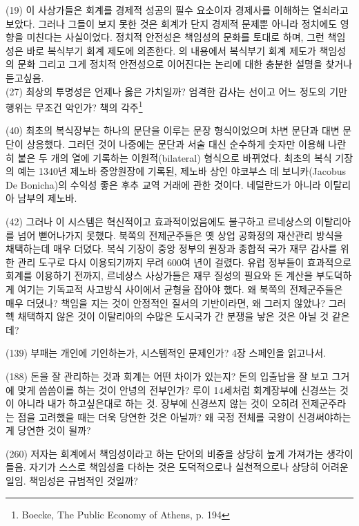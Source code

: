 \documentclass[12pt, a4paper]{article}
\begin{document}
(19) 이 사상가들은 회계를 경제적 성공의 필수 요소이자 경제사를 이해하는 열쇠라고 보았다. 그러나 그들이 보지 못한 것은 회계가 단지 경제적 문제뿐 아니라 정치에도 영향을 미친다는 사실이었다. 정치적 안전성은 책임성의 문화를 토대로 하며, 그런 책임성은 바로 복식부기 회계 제도에 의존한다. 의 내용에서 복식부기 회계 제도가 책임성의 문화 그리고 그게 정치적 안전성으로 이어진다는 논리에 대한 충분한 설명을 찾거나 듣고싶음. \\ 

(27) 최상의 투명성은 언제나 옳은 가치일까? 엄격한 감사는 선이고 어느 정도의 기만행위는 무조건 악인가? 책의 각주\footnote{Boecke, The Public Economy of Athens, p. 194} 

(40) 최초의 복식장부는 하나의 문단을 이루는 문장 형식이었으며 차변 문단과 대변 문단이 상응했다. 그러던 것이 나중에는 문단과 서술 대신 순수하게 숫자만 이용해 나란히 붙은 두 개의 열에 기록하는 이원적(bilateral) 형식으로 바뀌었다. 최초의 복식 기장의 예는 1340년 제노바 중앙원장에 기록된, 제노바 상인 야코부스 데 보니카(Jacobus De Bonicha)의 수익성 좋은 후추 교역 거래에 관한 것이다. 네덜란드가 아니라 이탈리아 남부의 제노바.

(42) 그러나 이 시스템은 혁신적이고 효과적이었음에도 불구하고 르네상스의 이탈리아를 넘어 뻗어나가지 못했다. 북쪽의 전제군주들은 옛 상업 공화정의 재산관리 방식을 채택하는데 매우 더뎠다. 복식 기장이 중앙 정부의 원장과 종합적 국가 재무 감사를 위한 관리 도구로 다시 이용되기까지 무려 600여 년이 걸렸다. 유럽 정부들이 효과적으로 회계를 이용하기 전까지, 르네상스 사상가들은 재무 질성의 필요와 돈 계산을 부도덕하게 여기는 기독교적 사고방식 사이에서 균형을 잡아야 했다. 왜 북쪽의 전제군주들은 매우 더뎠나? 책임을 지는 것이 안정적인 질서의 기반이라면, 왜 그러지 않았나? 그러헥 채택하지 않은 것이 이탈리아의 수많은 도시국가 간 분쟁을 낳은 것은 아닐 것 같은데?

(139) 부패는 개인에 기인하는가, 시스템적인 문제인가? 4장 스페인을 읽고나서. 

(188) 돈을 잘 관리하는 것과 회계는 어떤 차이가 있는지? 돈의 입출납을 잘 보고 그거에 맞게 씀씀이를 하는 것이 안녕의 전부인가? 루이 14세처럼 회계장부에 신경쓰는 것이 아니라 내가 하고싶은대로 하는 것. 장부에 신경쓰지 않는 것이 오히려 전제군주라는 점을 고려했을 때는 더욱 당연한 것은 아닐까? 왜 국정 전체를 국왕이 신경써야하는게 당연한 것이 될까?


(260) 저자는 회계에서 책임성이라고 하는 단어의 비중을 상당히 높게 가져가는 생각이 들음. 자기가 스스로 책임성을 다하는 것은 도덕적으로나 실천적으로나 상당히 어려운 일임. 책임성은 규범적인 것일까?
\end{document}
